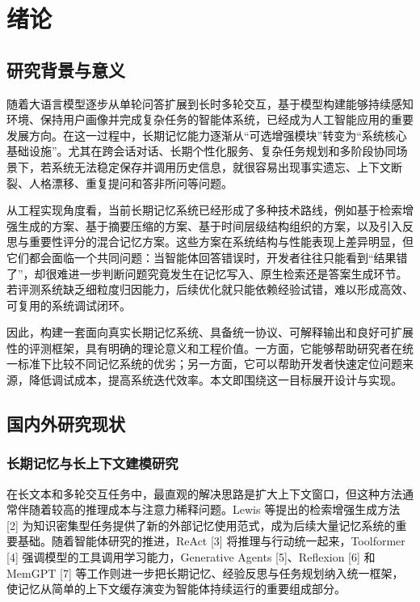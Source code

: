 
\chapter{绪论}

\section{研究背景与意义}

随着大语言模型逐步从单轮问答扩展到长时多轮交互，基于模型构建能够持续感知环境、保持用户画像并完成复杂任务的智能体系统，已经成为人工智能应用的重要发展方向。在这一过程中，长期记忆能力逐渐从“可选增强模块”转变为“系统核心基础设施”。尤其在跨会话对话、长期个性化服务、复杂任务规划和多阶段协同场景下，若系统无法稳定保存并调用历史信息，就很容易出现事实遗忘、上下文断裂、人格漂移、重复提问和答非所问等问题。

从工程实现角度看，当前长期记忆系统已经形成了多种技术路线，例如基于检索增强生成的方案、基于摘要压缩的方案、基于时间层级结构组织的方案，以及引入反思与重要性评分的混合记忆方案。这些方案在系统结构与性能表现上差异明显，但它们都会面临一个共同问题：当智能体回答错误时，开发者往往只能看到“结果错了”，却很难进一步判断问题究竟发生在记忆写入、原生检索还是答案生成环节。若评测系统缺乏细粒度归因能力，后续优化就只能依赖经验试错，难以形成高效、可复用的系统调试闭环。

因此，构建一套面向真实长期记忆系统、具备统一协议、可解释输出和良好可扩展性的评测框架，具有明确的理论意义和工程价值。一方面，它能够帮助研究者在统一标准下比较不同记忆系统的优劣；另一方面，它可以帮助开发者快速定位问题来源，降低调试成本，提高系统迭代效率。本文即围绕这一目标展开设计与实现。

\section{国内外研究现状}

\subsection{长期记忆与长上下文建模研究}

在长文本和多轮交互任务中，最直观的解决思路是扩大上下文窗口，但这种方法通常伴随着较高的推理成本与注意力稀释问题。Lewis 等提出的检索增强生成方法 [2] 为知识密集型任务提供了新的外部记忆使用范式，成为后续大量记忆系统的重要基础。随着智能体研究的推进，ReAct [3] 将推理与行动统一起来，Toolformer [4] 强调模型的工具调用学习能力，Generative Agents [5]、Reflexion [6] 和 MemGPT [7] 等工作则进一步把长期记忆、经验反思与任务规划纳入统一框架，使记忆从简单的上下文缓存演变为智能体持续运行的重要组成部分。

